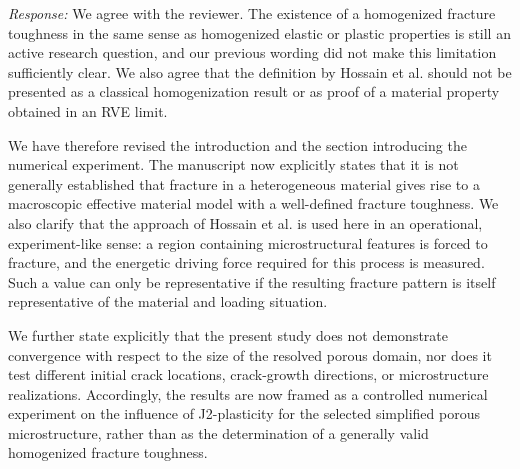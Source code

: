 \documentclass[pdflatex,sn-mathphys-num]{sn-jnl}
\begin{document}
\emph{Response:} We agree with the reviewer. The existence of a homogenized fracture toughness in the same sense as homogenized elastic or plastic properties is still an active research question, and our previous wording did not make this limitation sufficiently clear. We also agree that the definition by Hossain et al. should not be presented as a classical homogenization result or as proof of a material property obtained in an RVE limit.

We have therefore revised the introduction and the section introducing the numerical experiment. The manuscript now explicitly states that it is not generally established that fracture in a heterogeneous material gives rise to a macroscopic effective material model with a well-defined fracture toughness. We also clarify that the approach of Hossain et al. is used here in an operational, experiment-like sense: a region containing microstructural features is forced to fracture, and the energetic driving force required for this process is measured. Such a value can only be representative if the resulting fracture pattern is itself representative of the material and loading situation.

We further state explicitly that the present study does not demonstrate convergence with respect to the size of the resolved porous domain, nor does it test different initial crack locations, crack-growth directions, or microstructure realizations. Accordingly, the results are now framed as a controlled numerical experiment on the influence of J2-plasticity for the selected simplified porous microstructure, rather than as the determination of a generally valid homogenized fracture toughness.
\end{document}
